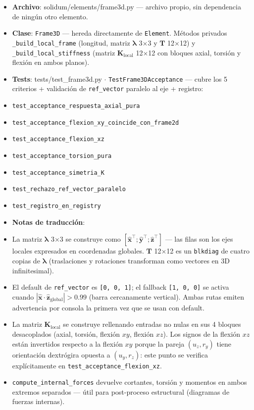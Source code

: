 \documentclass[11pt,letterpaper,oneside]{report}
\begin{document}
\begin{itemize}
  \item \textbf{Archivo}: solidum/elements/frame3d.py --- archivo propio, sin dependencia de ningún otro elemento.
  \item \textbf{Clase}: \texttt{Frame3D} --- hereda directamente de \texttt{Element}. Métodos privados \texttt{\_build\_local\_frame} (longitud, matriz $\boldsymbol{\lambda}$ 3\ensuremath{\times}3 y $\mathbf T$ 12\ensuremath{\times}12) y \texttt{\_build\_local\_stiffness} (matriz $\mathbf K_{\text{local}}$ 12\ensuremath{\times}12 con bloques axial, torsión y flexión en ambos planos).
  \item \textbf{Tests}: tests/test\_frame3d.py \ensuremath{\cdot} \texttt{TestFrame3DAcceptance} --- cubre los 5 criterios + validación de \texttt{ref\_vector} paralelo al eje + registro:
  \item \texttt{test\_acceptance\_respuesta\_axial\_pura}
  \item \texttt{test\_acceptance\_flexion\_xy\_coincide\_con\_frame2d}
  \item \texttt{test\_acceptance\_flexion\_xz}
  \item \texttt{test\_acceptance\_torsion\_pura}
  \item \texttt{test\_acceptance\_simetria\_K}
  \item \texttt{test\_rechazo\_ref\_vector\_paralelo}
  \item \texttt{test\_registro\_en\_registry}
  \item \textbf{Notas de traducción}:
  \item La matriz $\boldsymbol{\lambda}$ 3\ensuremath{\times}3 se construye como $[\hat{\mathbf x}^\top; \hat{\mathbf y}^\top; \hat{\mathbf z}^\top]$ --- las filas son los ejes locales expresados en coordenadas globales. $\mathbf T$ 12\ensuremath{\times}12 es un \texttt{blkdiag} de cuatro copias de $\boldsymbol{\lambda}$ (traslaciones y rotaciones transforman como vectores en 3D infinitesimal).
  \item El default de \texttt{ref\_vector} es \texttt{[0, 0, 1]}; el fallback \texttt{[1, 0, 0]} se activa cuando $|\hat{\mathbf x} \cdot \hat{\mathbf z}_{\text{global}}| > 0.99$ (barra cercanamente vertical). Ambas rutas emiten advertencia por consola la primera vez que se usan con default.
  \item La matriz $\mathbf K_{\text{local}}$ se construye rellenando entradas no nulas en sus 4 bloques desacoplados (axial, torsión, flexión $xy$, flexión $xz$). Los signos de la flexión $xz$ están invertidos respecto a la flexión $xy$ porque la pareja $(u_z, r_y)$ tiene orientación dextrógira opuesta a $(u_y, r_z)$: este punto se verifica explícitamente en \texttt{test\_acceptance\_flexion\_xz}.
  \item \texttt{compute\_internal\_forces} devuelve cortantes, torsión y momentos en ambos extremos separados --- útil para post-proceso estructural (diagramas de fuerzas internas).
\end{itemize}
\end{document}
